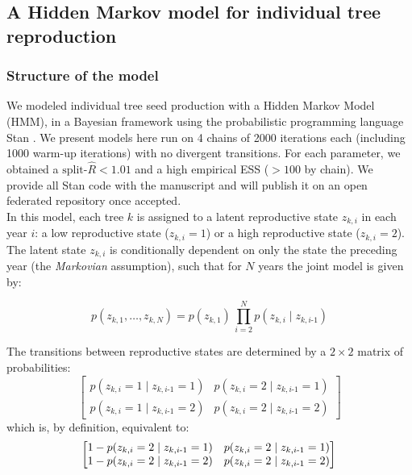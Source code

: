 \documentclass[11pt]{article}
\begin{document}
\subsection*{A Hidden Markov model for individual tree reproduction}

\subsubsection*{Structure of the model}

We modeled individual tree seed production with a Hidden Markov Model (HMM), in a Bayesian framework using the probabilistic programming language Stan \citep{Carpenter2017}. We present models here run on 4 chains of 2000 iterations each (including 1000 warm-up iterations) with no divergent transitions. For each parameter, we obtained a $\text{split-}\widehat{R}<1.01$  and a high empirical ESS ($>100$ by chain). We provide all Stan code with the manuscript and will publish it on an open federated repository once accepted. \\
In this model, each tree $k$ is assigned to a latent reproductive state $z_{k,i}$ in each year $i$: a low reproductive state ($z_{k,i}=1$) or a high reproductive state ($z_{k,i}=2$). The latent state $z_{k,i}$ is conditionally dependent on only the state the preceding year (the \emph{Markovian} assumption), such that for $N$ years the joint model is given by:

\begin{equation}
p(z_{k,1}, \ldots, z_{k,N}) = p(z_{k,1}) \, \prod_{i = 2}^{N} p(z_{k,i} \mid z_{k,i\text{-}1})
\end{equation}

\noindent The transitions between reproductive states are determined by a $2 \times 2$ matrix of probabilities:
\begin{equation}
\begin{bmatrix}
p(z_{k,i} = 1 \mid z_{k,i\text{-}1} = 1) & p(z_{k,i} = 2 \mid z_{k,i\text{-}1} = 1) \\
p(z_{k,i} = 1 \mid z_{k,i\text{-}1} = 2) & p(z_{k,i} = 2 \mid z_{k,i\text{-}1} = 2)
\end{bmatrix}
\end{equation}
\noindent  which is, by definition, equivalent to:
\begin{equation}
\label{matrix}
\begin{bmatrix}
1-p(z_{k,i} = 2 \mid z_{k,i\text{-}1} = 1) & p(z_{k,i} = 2 \mid z_{k,i\text{-}1} = 1) \\
1-p(z_{k,i} = 2 \mid z_{k,i\text{-}1} = 2) & p(z_{k,i} = 2 \mid z_{k,i\text{-}1} = 2)
\end{bmatrix}\\
\end{equation}
\end{document}
